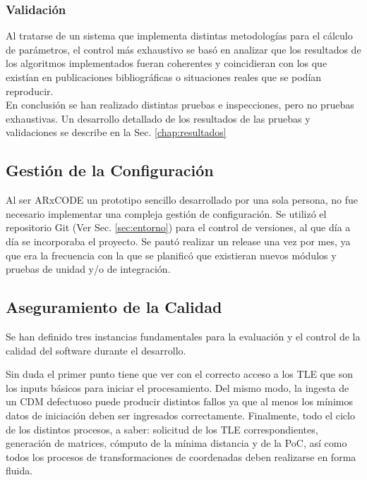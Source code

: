 \subsubsection*{Validaci\'on}

Al tratarse de un sistema que implementa distintas metodolog\'ias para el c\'alculo de par\'ametros, el control m\'as exhaustivo se bas\'o en analizar que los resultados de los algoritmos implementados fueran coherentes y coincidieran con los que exist\'ian en publicaciones bibliogr\'aficas o situaciones reales que se pod\'ian reproducir. \\

En conclusi\'on se han realizado distintas pruebas e inspecciones, pero no pruebas exhaustivas.
Un desarrollo detallado de los resultados de las pruebas y validaciones se describe en la Sec. \ref{chap:resultados}\\

\subsection{Gesti\'on de la Configuraci\'on}

Al ser ARxCODE un prototipo sencillo desarrollado por una sola persona, no fue necesario implementar una compleja gesti\'on de configuraci\'on. Se utiliz\'o el repositorio Git (Ver Sec. \ref{sec:entorno}) para el control de versiones, al que d\'ia a d\'ia se incorporaba el proyecto. Se paut\'o realizar un release una vez por mes, ya que era la frecuencia con la que se planific\'o que existieran nuevos m\'odulos y pruebas de unidad y/o de integraci\'on. 


\subsection{Aseguramiento de la Calidad}

Se han definido tres instancias fundamentales para la evaluaci\'on y el control de la calidad del software durante el desarrollo.

Sin duda el primer punto tiene que ver con el correcto acceso a los TLE que son los inputs b\'asicos para iniciar el procesamiento. Del mismo modo, la ingesta de un CDM defectuoso puede producir distintos fallos ya que al menos los m\'inimos datos de iniciaci\'on deben ser ingresados correctamente. Finalmente, todo el ciclo de los distintos procesos, a saber: solicitud de los TLE correspondientes, generaci\'on de matrices, c\'omputo de la m\'inima distancia y de la PoC, as\'i como todos los procesos de transformaciones de coordenadas deben realizarse en forma fluida.


